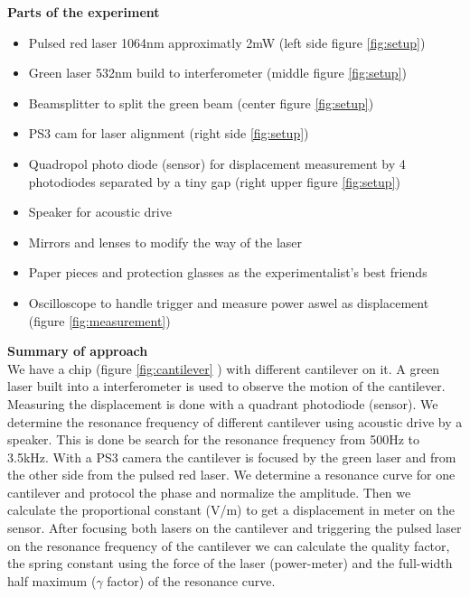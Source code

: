 \documentclass[12pt,a4paper]{article}
\begin{document}
\begin{multicols}{2}
\noindent
\textbf{Parts of the experiment}
\begin{itemize}
	\item Pulsed red laser 1064nm approximatly 2mW (left side figure \ref{fig:setup})
	\item Green laser 532nm build to interferometer (middle figure \ref{fig:setup})
	\item Beamsplitter to split the green beam (center figure \ref{fig:setup})
	\item PS3 cam for laser alignment (right side \ref{fig:setup})
	\item Quadropol photo diode (sensor) for displacement measurement by 4 photodiodes separated by a tiny gap (right upper figure \ref{fig:setup})
	\item Speaker for acoustic drive 
	\item Mirrors and lenses to modify the way of the laser
	\item Paper pieces and protection glasses as the experimentalist's best friends
	\item Oscilloscope to handle trigger and measure power aswel as displacement (figure \ref{fig:measurement})
\end{itemize}


\textbf{Summary of approach}\\
We have a chip (figure \ref{fig:cantilever} ) with different cantilever on it. A green laser built into a interferometer is used to observe the motion of the cantilever. Measuring the displacement is done with a quadrant photodiode (sensor). We determine the resonance frequency of different cantilever using acoustic drive by a speaker. This is done be search for the resonance frequency from 500Hz to 3.5kHz. With a PS3 camera the cantilever is focused by the green laser and from the other side from the pulsed red laser. We determine a resonance curve for one cantilever and protocol the phase and normalize the amplitude. Then we calculate the proportional constant (V/m) to get a displacement in meter on the sensor. After focusing both lasers on the cantilever and triggering the pulsed laser on the resonance frequency of the cantilever we can calculate the quality factor, the spring constant using the force of the laser (power-meter) and the full-width half maximum ($\gamma$ factor) of the resonance curve.


\end{multicols}
\end{document}
